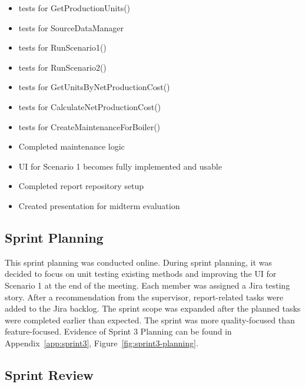 \begin{itemize}
    \item  tests for GetProductionUnits()
    
    \item  tests for SourceDataManager

    \item  tests for RunScenario1()

    \item  tests for RunScenario2()

    \item  tests for GetUnitsByNetProductionCost()

    \item tests for CalculateNetProductionCost()

    \item  tests for CreateMaintenanceForBoiler()

    \item  Completed maintenance logic

    \item  UI for Scenario 1 becomes fully implemented and usable

    \item Completed report repository setup

    \item  Created presentation for midterm evaluation

\end{itemize}

 

\subsection*{Sprint Planning}

This sprint planning was conducted online. During sprint planning, it was decided to focus on unit testing existing methods and improving the UI for Scenario 1 at the end of the meeting. Each member was assigned a Jira testing story. After a recommendation from the supervisor, report-related tasks were added to the Jira backlog. The sprint scope was expanded after the planned tasks were completed earlier than expected. The sprint was more quality-focused than feature-focused. Evidence of Sprint 3 Planning can be found in Appendix~\ref{app:sprint3}, Figure~\ref{fig:sprint3-planning}.

 

\subsection*{Sprint Review}

